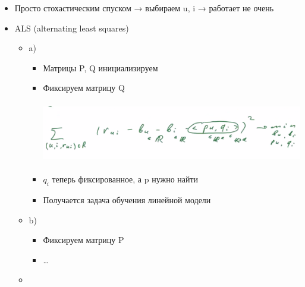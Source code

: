 \documentclass[a4paper, 12pt]{article}
\begin{document}
\begin{itemize}
\item
  
  Просто стохастическим спуском → выбираем u, i → работает не очень
  
\item
  
  ALS (alternating least squares)
  

  \begin{itemize}
  \item
    
    a)
    

    \begin{itemize}
    \item
      
      Матрицы P, Q инициализируем
      
    \item
      
      Фиксируем матрицу
      Q
      
      \includegraphics[width=5.18611in,height=1.06005in]{media/image3.png}
      
    \item
      
      \(q_{i}\) теперь фиксированное, а p нужно найти
      
    \item
      
      Получается задача обучения линейной модели
      
    \end{itemize}
  \item
    
    b)
    

    \begin{itemize}
    \item
      
      Фиксируем матрицу P
      
    \item
      
      \ldots{}
      
    \end{itemize}
  \item
    

\end{itemize}
\end{itemize}
\end{document}
